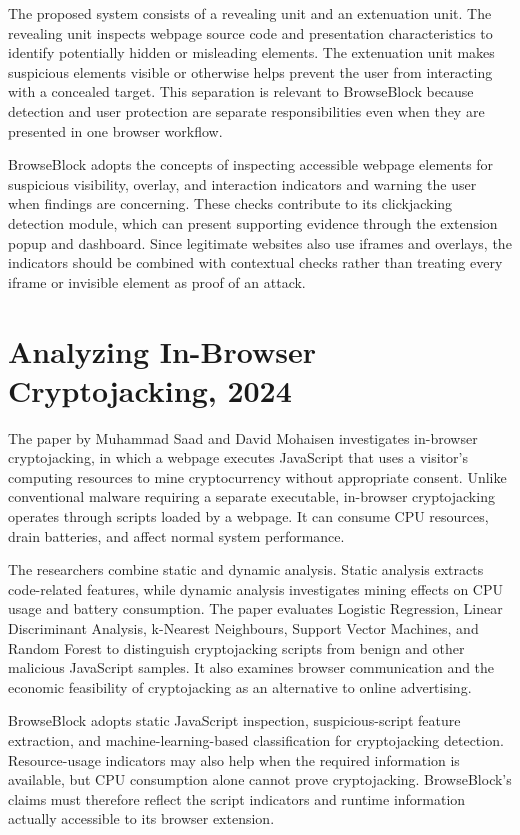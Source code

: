 The proposed system consists of a revealing unit and an extenuation unit. The
revealing unit inspects webpage source code and presentation characteristics to
identify potentially hidden or misleading elements. The extenuation unit makes
suspicious elements visible or otherwise helps prevent the user from interacting
with a concealed target. This separation is relevant to BrowseBlock because
detection and user protection are separate responsibilities even when they are
presented in one browser workflow.

BrowseBlock adopts the concepts of inspecting accessible webpage elements for
suspicious visibility, overlay, and interaction indicators and warning the user
when findings are concerning. These checks contribute to its clickjacking
detection module, which can present supporting evidence through the extension
popup and dashboard. Since legitimate websites also use iframes and overlays,
the indicators should be combined with contextual checks rather than treating
every iframe or invisible element as proof of an attack.

\clearpage
\section{Analyzing In-Browser Cryptojacking, 2024}
The paper by Muhammad Saad and David Mohaisen investigates in-browser
cryptojacking, in which a webpage executes JavaScript that uses a visitor's
computing resources to mine cryptocurrency without appropriate consent. Unlike
conventional malware requiring a separate executable, in-browser cryptojacking
operates through scripts loaded by a webpage. It can consume CPU resources, drain
batteries, and affect normal system performance.

The researchers combine static and dynamic analysis. Static analysis extracts
code-related features, while dynamic analysis investigates mining effects on CPU
usage and battery consumption. The paper evaluates Logistic Regression, Linear
Discriminant Analysis, k-Nearest Neighbours, Support Vector Machines, and Random
Forest to distinguish cryptojacking scripts from benign and other malicious
JavaScript samples. It also examines browser communication and the economic
feasibility of cryptojacking as an alternative to online advertising.

BrowseBlock adopts static JavaScript inspection, suspicious-script feature
extraction, and machine-learning-based classification for cryptojacking detection.
Resource-usage indicators may also help when the required information is available,
but CPU consumption alone cannot prove cryptojacking. BrowseBlock's claims must
therefore reflect the script indicators and runtime information actually accessible
to its browser extension.


